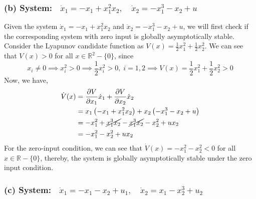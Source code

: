 \subsubsection*{(b) System:\( \quad \dot{x}_{1}=-x_{1}+x_{1}^{2} x_{2}, \quad \dot{x}_{2}=-x_{1}^{3}-x_{2}+u \)}

Given the system \( \dot{x}_{1}=-x_{1}+x_{1}^{2} x_{2} \) and \( \dot{x}_{2}=-x_{1}^{3}-x_{2}+u \), we will first check if the corresponding system with zero input is globally asymptotically stable.
Consider the Lyapunov candidate function as \( V(x)=\frac{1}{2} x_{1}^{2}+\frac{1}{2} x_{2}^{2} \).
We can see that \( V(x) > 0 \) for all \( x \in \mathbb{R}^2 - \{ 0 \} \), since
\begin{equation*}
    x_i \neq 0
    \implies
    x_i^2 > 0
    \implies
    \frac{1}{2} x_i^2 > 0,
    \;
    i = 1, 2
    \implies
    V(x)
    =
    \frac{1}{2} x_1^2 + \frac{1}{2} x_2^2
    > 0
\end{equation*}
Now, we have,
\begin{align*}
    \dot{V}(x)
     & =
    \frac{\partial V}{\partial x_1} \dot{x}_1 + \frac{\partial V}{\partial x_2} \dot{x}_2
    \\
     & =
    x_1 \left( -x_1 + x_1^2 x_2 \right) + x_2 \left( -x_1^3 - x_2 + u \right)
    \\
     & =
    -x_1^2 + \cancel{x_1^3 x_2} - \cancel{x_1^3 x_2} - x_2^2 + u x_2
    \\
     & =
    -x_1^2 - x_2^2 + u x_2
\end{align*}
For the zero-input condition, we can see that \( \dot{V}(x) = -x_1^2 - x_2^2 < 0 \) for all \( x \in \mathbb{R} - \{ 0 \} \), thereby, the system is globally asymptotically stable under the zero input condition.

\subsubsection*{(c) System:\( \quad \dot{x}_{1}=-x_{1}-x_{2}+u_{1}, \quad \dot{x}_{2}=x_{1}-x_{2}^{3}+u_{2} \)}


